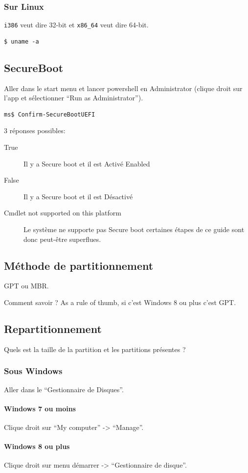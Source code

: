\documentclass{../guide}
\begin{document}
\subsubsection{Sur Linux}
\verb|i386| veut dire 32-bit et \verb|x86_64| veut dire 64-bit.
\begin{verbatim}
$ uname -a
\end{verbatim}

\subsection{SecureBoot}
Aller dans le start menu et lancer powershell en Administrator (clique droit sur l'app et sélectionner ``Run as Administrator'').
\begin{verbatim}
ms$ Confirm-SecureBootUEFI
\end{verbatim}
3 réponses possibles:
\begin{description}
  \item[True] Il y a Secure boot et il est Activé Enabled
  \item[False] Il y a Secure boot et il est Désactivé
  \item[Cmdlet not supported on this platform] Le système ne supporte pas Secure boot certaines étapes de ce guide sont donc peut-être superflues.
\end{description}

\subsection{Méthode de partitionnement}
GPT ou MBR.

Comment savoir ? 
As a rule of thumb, si c'est Windows 8 ou plus c'est GPT.

\subsection{Repartitionnement}
Quels est la taille de la partition et les partitions présentes ?
\subsubsection{Sous Windows}
Aller dans le ``Gestionnaire de Disques''.
\paragraph{Windows 7 ou moins}
Clique droit sur ``My computer'' -> ``Manage''.
\paragraph{Windows 8 ou plus}
Clique droit sur menu démarrer -> ``Gestionnaire de disque''.
\end{document}
